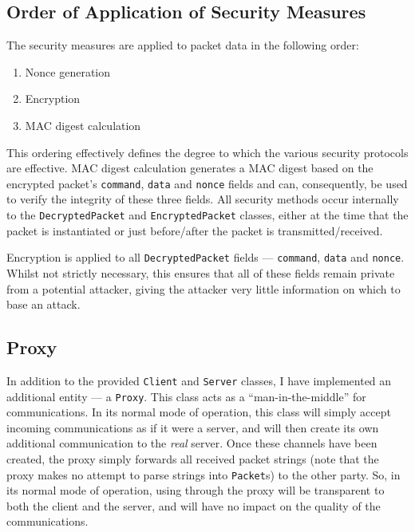 \documentclass[a4paper,11pt]{article}
\begin{document}
\subsection{Order of Application of Security Measures}
The security measures are applied to packet data in the following order:
\begin{enumerate}
\item Nonce generation
\item Encryption
\item MAC digest calculation
\end{enumerate}

This ordering effectively defines the degree to which the various security 
protocols are effective. MAC digest calculation generates a MAC digest based on
the encrypted packet's \verb+command+, \verb+data+ and \verb+nonce+ fields and 
can, consequently, be used to verify the integrity of these three fields. All 
security methods occur internally to the \verb+DecryptedPacket+ and 
\verb+EncryptedPacket+ classes, either at the time that the packet is 
instantiated or just before/after the packet is transmitted/received.

Encryption is applied to all \verb+DecryptedPacket+ fields --- \verb+command+, 
\verb+data+ and \verb+nonce+. Whilst not strictly necessary, this ensures that 
all of these fields remain private from a potential attacker, giving the 
attacker very little information on which to base an attack. 

\subsection{Proxy}
In addition to the provided \serviceName{} \verb+Client+ and \verb+Server+ 
classes, I have implemented an additional \serviceName{} entity --- a 
\serviceName{} \verb+Proxy+. This class acts as a ``man-in-the-middle'' for
\serviceName{} communications. In its normal mode of operation, this class will
simply accept incoming \serviceName{} communications as if it were a 
\serviceName{} server, and will then create its own additional \serviceName{}
communication to the \emph{real} \serviceName{} server. Once these channels have
been created, the proxy simply forwards all received packet strings (note that 
the proxy makes no attempt to parse strings into \verb+Packet+s) to the other
party. So, in its normal mode of operation, using \serviceName{} through the
proxy will be transparent to both the client and the server, and will have no
impact on the quality of the communications.
\end{document}
